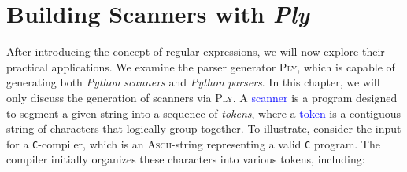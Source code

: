 \chapter{Building Scanners with \textsl{Ply} \label{chapter:ply-lex}}
After introducing the concept of regular expressions, we will now explore their practical applications. We
examine the parser generator \textsc{Ply}, which is capable of generating both \textsl{Python}
\emph{scanners} and \textsl{Python} \emph{parsers}.  In this chapter, we will only discuss the generation of
scanners via \textsc{Ply}.
A \textcolor{blue}{scanner} is a program
designed to segment a given string into a sequence of \emph{tokens}, where a
\textcolor{blue}{token} is a contiguous string of characters that logically group together. To
illustrate, consider the input for a \texttt{C}-compiler, which is an \textsc{Ascii}-string representing a
valid \texttt{C} program. The compiler initially organizes these characters into various tokens, including: 

